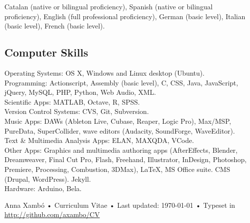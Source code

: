 \documentclass[10pt, a4paper]{article}
\begin{document}
Catalan (native or bilingual proficiency), Spanish (native or bilingual proficiency), English (full professional proficiency), German (basic level), Italian (basic level), French (basic level).\\[-0.5cm]%

\subsection*{Computer Skills}
\noindent

Operating Systems: OS X, Windows and Linux desktop (Ubuntu).\\
Programming: Actionscript, Assembly (basic level), C, CSS, Java, JavaScript, jQuery, MySQL, PHP, Python, Web Audio, XML.\\
Scientific Apps: MATLAB, Octave, R, SPSS.\\
Version Control Systems: CVS, Git, Subversion.\\
Music Apps: DAWs (Ableton Live, Cubase, Reaper, Logic Pro), Max/MSP, PureData, SuperCollider, wave editors (Audacity, SoundForge, WaveEditor).\\
Text \& Multimedia Analysis Apps: ELAN, MAXQDA, VCode.\\
Other Apps: Graphics and multimedia authoring apps (AfterEffects, Blender, Dreamweaver, Final Cut Pro, Flash, Freehand, Illustrator, InDesign, Photoshop, Premiere, Processing, Combustion, 3DMax), LaTeX, MS Office suite. CMS (Drupal, WordPress). Jekyll.\\
Hardware: Arduino, Bela.\\

\vfill{}

\begin{center}
{\scriptsize  Anna Xambó •\- Curriculum Vitae •\- Last updated: \today\- •\- %
Typeset in \href{http://nitens.org/taraborelli/cvtex}{
\XeTeX }\\
\href{http://github.com/axambo/CV}{http://github.com/axambo/CV}}
\end{center}
\end{document}
